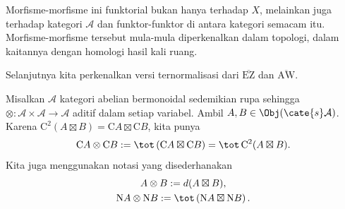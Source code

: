 Morfisme-morfisme ini funktorial bukan hanya terhadap $X$, melainkan juga
terhadap kategori $\mathcal{A}$ dan funktor-funktor di antara kategori
semacam itu. Morfisme-morfisme tersebut mula-mula diperkenalkan dalam
topologi, dalam kaitannya dengan homologi hasil kali ruang.

Selanjutnya kita perkenalkan versi ternormalisasi dari
$\overline{\mathrm{EZ}}$ dan $\overline{\mathrm{AW}}$.

Misalkan $\mathcal{A}$ kategori abelian bermonoidal sedemikian rupa sehingga
$\otimes:\mathcal{A}\times\mathcal{A}\to\mathcal{A}$ aditif dalam setiap
variabel. Ambil $A,B\in\Obj(\cate{s}\mathcal{A})$. Karena
$\mathrm{C}^2(A\boxtimes B)=\mathrm{C}A\boxtimes\mathrm{C}B$, kita punya
\[ \mathrm{C}A \otimes \mathrm{C}B := \tot\left( \mathrm{C}A \boxtimes \mathrm{C}B \right) = \tot \, \mathrm{C}^2 (A \boxtimes B). \]
Kita juga menggunakan notasi yang disederhanakan
\begin{gather*}
	A \otimes B := d(A \boxtimes B), \\
	\mathrm{N}A \otimes \mathrm{N}B := \tot\left( \mathrm{N}A \boxtimes \mathrm{N}B \right).
\end{gather*}

